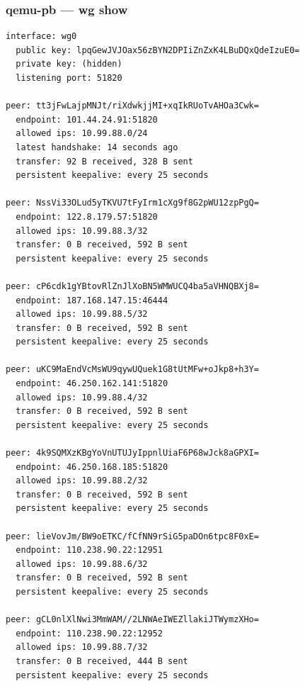 \documentclass[11pt,a4paper]{article}
\begin{document}
\subsubsection*{qemu-pb — wg show}
\begin{lstlisting}
interface: wg0
  public key: lpqGewJVJOax56zBYN2DPIiZnZxK4LBuDQxQdeIzuE0=
  private key: (hidden)
  listening port: 51820

peer: tt3jFwLajpMNJt/riXdwkjjMI+xqIkRUoTvAHOa3Cwk=
  endpoint: 101.44.24.91:51820
  allowed ips: 10.99.88.0/24
  latest handshake: 14 seconds ago
  transfer: 92 B received, 328 B sent
  persistent keepalive: every 25 seconds

peer: NssVi33OLud5yTKVU7tFyIrm1cXg9f8G2pWU12zpPgQ=
  endpoint: 122.8.179.57:51820
  allowed ips: 10.99.88.3/32
  transfer: 0 B received, 592 B sent
  persistent keepalive: every 25 seconds

peer: cP6cdk1gYBtovRlZnJlXoBN5WMWUCQ4ba5aVHNQBXj8=
  endpoint: 187.168.147.15:46444
  allowed ips: 10.99.88.5/32
  transfer: 0 B received, 592 B sent
  persistent keepalive: every 25 seconds

peer: uKC9MaEndVcMsWU9qywUQuek1G8tUtMFw+oJkp8+h3Y=
  endpoint: 46.250.162.141:51820
  allowed ips: 10.99.88.4/32
  transfer: 0 B received, 592 B sent
  persistent keepalive: every 25 seconds

peer: 4k9SQMXzKBgYoVnUTUJyIppnlUiaF6P68wJck8aGPXI=
  endpoint: 46.250.168.185:51820
  allowed ips: 10.99.88.2/32
  transfer: 0 B received, 592 B sent
  persistent keepalive: every 25 seconds

peer: lieVovJm/BW9oETKC/fCfNN9rSiG5paDOn6tpc8F0xE=
  endpoint: 110.238.90.22:12951
  allowed ips: 10.99.88.6/32
  transfer: 0 B received, 592 B sent
  persistent keepalive: every 25 seconds

peer: gCL0nlXlNwi3MmWAM//2LNWAeIWEZllakiJTWymzXHo=
  endpoint: 110.238.90.22:12952
  allowed ips: 10.99.88.7/32
  transfer: 0 B received, 444 B sent
  persistent keepalive: every 25 seconds

\end{lstlisting}
\end{document}
